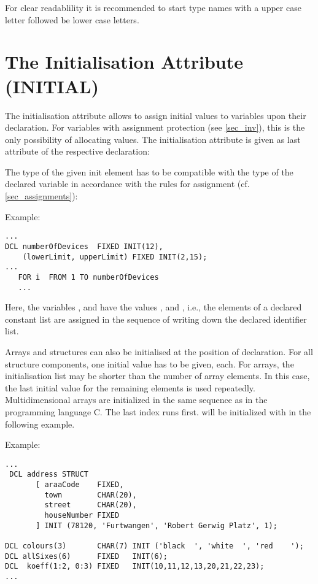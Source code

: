 For clear readablility it is recommended to start type names with a 
upper case letter followed be lower case letters.

\section{The Initialisation Attribute (INITIAL)}   %
\label{sec_init}

The initialisation attribute allows to assign initial values to
variables upon their declaration. For variables with assignment
protection (see \ref{sec_inv}), this is the only possibility of allocating
values. The initialisation attribute is given as last attribute of the
respective declaration:

\begin{grammarframe}



\end{grammarframe}

The type of the given init element has to be compatible with the type of
the declared variable in accordance with the rules for assignment (cf.
\ref{sec_assignments}):

Example:

\begin{lstlisting}
...
DCL numberOfDevices  FIXED INIT(12),
    (lowerLimit, upperLimit) FIXED INIT(2,15);
...
   FOR i  FROM 1 TO numberOfDevices
   ...
\end{lstlisting}

Here, the variables ,  
and 
 have the values ,  and ,
 i.e., the elements of a declared constant list are assigned in
the sequence of writing down the declared identifier list.

Arrays and structures can also be initialised at the position of
declaration. For all structure components, one initial value has to be
given, each. For arrays, the initialisation list may be shorter than the
number of array elements. In this case, the last initial value for the
remaining elements is used repeatedly.
Multidimensional arrays are initialized in the same sequence as in the 
programming language C. The last index runs first.
 will be initialized with  in the following example.

Example:

\begin{lstlisting}
...
 DCL address STRUCT 
       [ araaCode    FIXED,
         town        CHAR(20),
         street      CHAR(20),
         houseNumber FIXED
       ] INIT (78120, 'Furtwangen', 'Robert Gerwig Platz', 1);

DCL colours(3)       CHAR(7) INIT ('black  ', 'white  ', 'red    ');
DCL allSixes(6)      FIXED   INIT(6);
DCL  koeff(1:2, 0:3) FIXED   INIT(10,11,12,13,20,21,22,23);
... 
\end{lstlisting}

